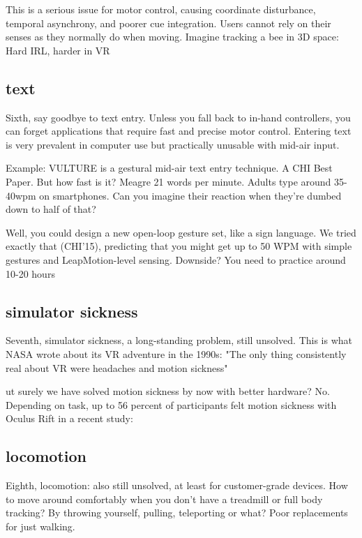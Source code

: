 This is a serious issue for motor control, causing coordinate disturbance, temporal asynchrony, and poorer cue integration. Users cannot rely on their senses as they normally do when moving. Imagine tracking a bee in 3D space: Hard IRL, harder in VR


\subsection{text}
Sixth, say goodbye to text entry. Unless you fall back to in-hand controllers, you can forget applications that require fast and precise motor control. Entering text is very prevalent in computer use but practically unusable with mid-air input. 



Example: VULTURE is a gestural mid-air text entry technique. A CHI Best Paper. But how fast is it? Meagre 21 words per minute.  Adults type around 35-40wpm on smartphones. Can you imagine their reaction when they're dumbed down to half of that?

Well, you could design a new open-loop gesture set, like a sign language. We tried exactly that (CHI'15), predicting that you might get up to 50 WPM with simple gestures and LeapMotion-level sensing. Downside? You need to practice around 10-20 hours


\subsection{simulator sickness}
Seventh, simulator sickness, a long-standing problem, still unsolved. This is what NASA wrote about its VR adventure in the 1990s: "The only thing consistently real about VR were headaches and motion sickness" 

ut surely we have solved motion sickness by now with better hardware? No. Depending on task, up to 56 percent of participants felt motion sickness with Oculus Rift in a recent study: 


\subsection{locomotion}
Eighth, locomotion: also still unsolved, at least for customer-grade devices. How to move around comfortably when you don't have a treadmill or full body tracking? By throwing yourself, pulling, teleporting or what? Poor replacements for just walking.



